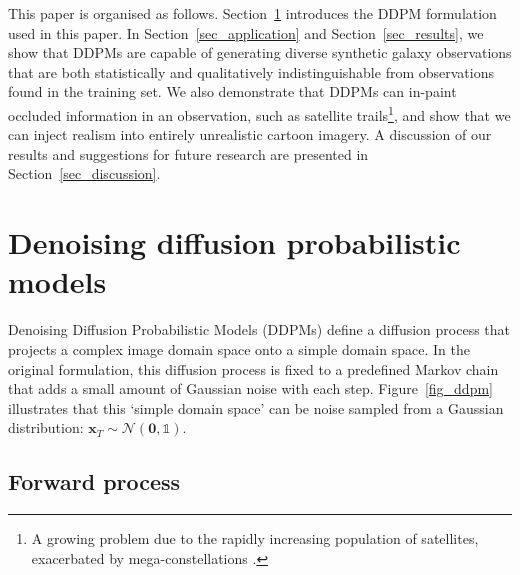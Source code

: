 \documentclass[fleqn,usenatbib]{mnras}
\begin{document}
This paper is organised as follows. Section~\ref{sec_ddpm} introduces the
DDPM formulation used in this paper. In Section~\ref{sec_application} and
Section~\ref{sec_results}, we show that DDPMs are capable of generating diverse
synthetic galaxy observations that are both statistically and qualitatively
indistinguishable from observations found in the training set. We also
demonstrate that DDPMs can in-paint occluded information in an observation,
such as satellite trails\footnote{A
growing problem due to the rapidly increasing population of satellites,
exacerbated by mega-constellations \citep{cite_kocifaj2021}.}, and show that we
can inject realism into entirely unrealistic cartoon imagery. A discussion of
our results and suggestions for future research are presented in
Section~\ref{sec_discussion}.

\section{Denoising diffusion probabilistic models} \label{sec_ddpm}

Denoising Diffusion Probabilistic Models (DDPMs) define a diffusion process
that projects a complex image domain space onto a simple domain space. In the
original formulation, this diffusion process is fixed to a predefined Markov
chain that adds a small amount of Gaussian noise with each step.
Figure~\ref{fig_ddpm} illustrates that this `simple domain space' can be noise
sampled from a Gaussian distribution: $\mathbf{x}_T \sim
\mathcal{N}(\mathbf{0},\mathds{1})$.

\subsection{Forward process}
\end{document}
